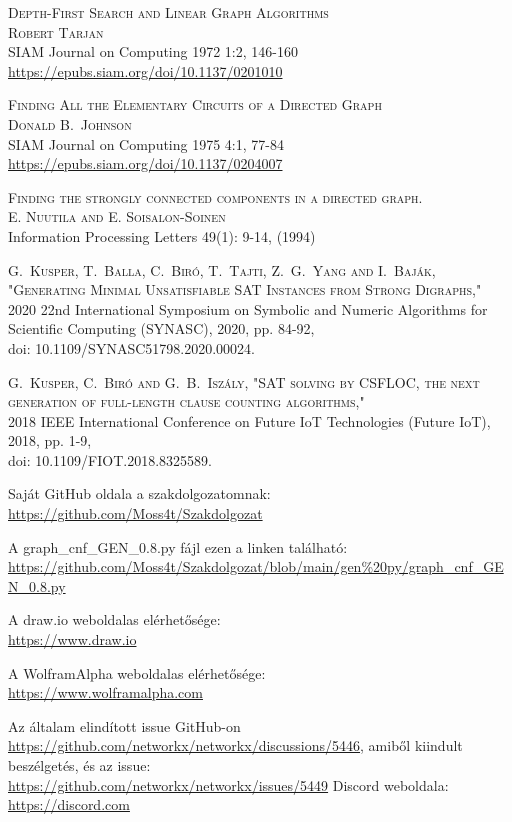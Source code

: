 \documentclass[
]{thesis-ekf}
\theoremstyle{definition}
\theoremstyle{remark}
\begin{document}
\begin{thebibliography}{2}
	\textsc{Depth-First Search and Linear Graph Algorithms
	\\Robert Tarjan}
	\\SIAM Journal on Computing 1972 1:2, 146-160
	\\\url{https://epubs.siam.org/doi/10.1137/0201010}

	\textsc{Finding All the Elementary Circuits of a Directed Graph
	\\Donald B.~Johnson}
	\\SIAM Journal on Computing 1975 4:1, 77-84
	\\\url{https://epubs.siam.org/doi/10.1137/0204007}
	
	\textsc{Finding the strongly connected components in a directed graph.}
	\\\textsc{E. Nuutila and E. Soisalon-Soinen }
	\\Information Processing Letters 49(1): 9-14, (1994)
	
	\textsc{G.~Kusper, T.~Balla, C.~Biró, T.~Tajti, Z.~G.~Yang and I.~Baják, "Generating Minimal Unsatisfiable SAT Instances from Strong Digraphs,"}
	\\2020 22nd International Symposium on Symbolic and Numeric Algorithms for Scientific Computing (SYNASC), 2020, pp. 84-92, 
	\\doi: 10.1109/SYNASC51798.2020.00024.
	
	\textsc{G.~Kusper, C.~Biró and G.~B.~Iszály, "SAT solving by CSFLOC, the next generation of full-length clause counting algorithms,"}
	\\2018 IEEE International Conference on Future IoT Technologies (Future IoT), 2018, pp. 1-9, 
	\\doi: 10.1109/FIOT.2018.8325589.
	
	Saját GitHub oldala a szakdolgozatomnak:
	\\\url{https://github.com/Moss4t/Szakdolgozat}
	
	A graph\_cnf\_GEN\_0.8.py fájl ezen a linken található:
	\\\url{https://github.com/Moss4t/Szakdolgozat/blob/main/gen%20py/graph_cnf_GEN_0.8.py}
		
	A draw.io weboldalas elérhetősége:
	\\\url{https://www.draw.io}
	
	A WolframAlpha weboldalas elérhetősége:
	\\\url{https://www.wolframalpha.com}
	
	Az általam elindított issue GitHub-on
	\\\url{https://github.com/networkx/networkx/discussions/5446}, amiből kiindult beszélgetés, és az issue:
	\\\url{https://github.com/networkx/networkx/issues/5449}		
	Discord weboldala:
	\\\url{https://discord.com}
\end{thebibliography}
	
	
\end{document}
